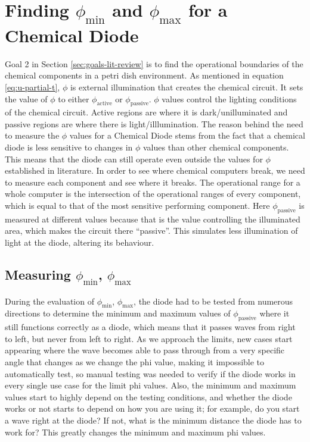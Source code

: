 \section{Finding $\phi_{\text{min}}$ and $\phi_{\text{max}}$ for a Chemical Diode} \label{sec:finding-phi-min-max}
Goal 2 in Section \ref{sec:goals-lit-review} is to find the operational boundaries of the chemical components in a petri dish environment.
As mentioned in equation \ref{eq:u-partial-t}, $\phi$ is external illumination that creates the chemical circuit. It sets the value of $\phi$ to either $\phi_{\text{active}}$ or $\phi_{\text{passive}}$. 
$\phi$ values control the lighting conditions of the chemical circuit.
Active regions are where it is dark/unilluminated and passive regions are where there is light/illlumination.
The reason behind the need to measure the $\phi$ values for a Chemical Diode stems from the fact that a chemical diode is less sensitive to changes in $\phi$ values than other chemical components.
This means that the diode can still operate even outside the values for $\phi$ established in literature. In order to see where chemical computers break, we need to measure each component and see where it breaks.
The operational range for a whole computer is the intersection of the operational ranges of every component, which is equal to that of the most sensitive performing component.
Here $\phi_{\text{passive}}$ is measured at different values because that is the value controlling the illuminated area, which makes the circuit there ``passive''. This simulates less illumination of light at the diode, altering its behaviour.
\subsection{Measuring $\phi_{\text{min}}$, $\phi_{\text{max}}$}


During the evaluation of $\phi_{\text{min}}$, $\phi_{\text{max}}$, the diode had to be tested from numerous directions to determine the minimum and maximum values of $\phi_{\text{passive}}$ where it still functions correctly as a diode, 
which means that it passes waves from right to left, but never from left to right. As we approach the limits, new cases start appearing where the wave becomes able to pass through from a very specific angle that changes as we change the phi value, 
making it impossible to automatically test, so manual testing was needed to verify if the diode works in every single use case for the limit phi values. Also, the minimum and maximum values start to highly depend on the testing conditions, 
and whether the diode works or not starts to depend on how you are using it; for example, do you start a wave right at the diode? 
If not, what is the minimum distance the diode has to work for? This greatly changes the minimum and maximum phi values. 
